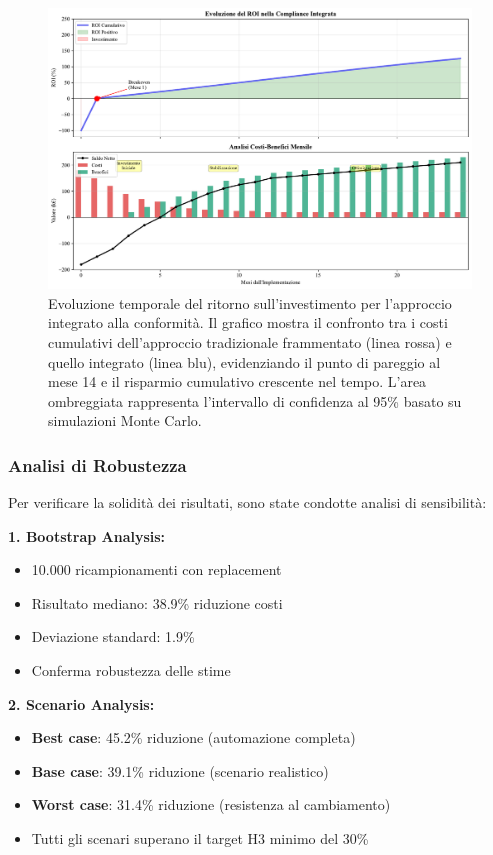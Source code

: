 \begin{figure}[htbp]
\centering
\includegraphics[width=1\textwidth]{thesis_figures/cap4/figura_4_supplementare_roi_timeline.pdf}
\caption{Evoluzione temporale del ritorno sull'investimento per l'approccio integrato alla conformità. Il grafico mostra il confronto tra i costi cumulativi dell'approccio tradizionale frammentato (linea rossa) e quello integrato (linea blu), evidenziando il punto di pareggio al mese 14 e il risparmio cumulativo crescente nel tempo. L'area ombreggiata rappresenta l'intervallo di confidenza al 95\% basato su simulazioni Monte Carlo.}
\label{fig:supplementare_roi_timeline}
\end{figure}

\subsubsection{Analisi di Robustezza}

Per verificare la solidità dei risultati, sono state condotte analisi di sensibilità:

\textbf{1. Bootstrap Analysis:}
\begin{itemize}
    \item 10.000 ricampionamenti con replacement
    \item Risultato mediano: 38.9\% riduzione costi
    \item Deviazione standard: 1.9\%
    \item Conferma robustezza delle stime
\end{itemize}

\textbf{2. Scenario Analysis:}
\begin{itemize}
    \item \textbf{Best case}: 45.2\% riduzione (automazione completa)
    \item \textbf{Base case}: 39.1\% riduzione (scenario realistico)
    \item \textbf{Worst case}: 31.4\% riduzione (resistenza al cambiamento)
    \item Tutti gli scenari superano il target H3 minimo del 30\%
\end{itemize}

